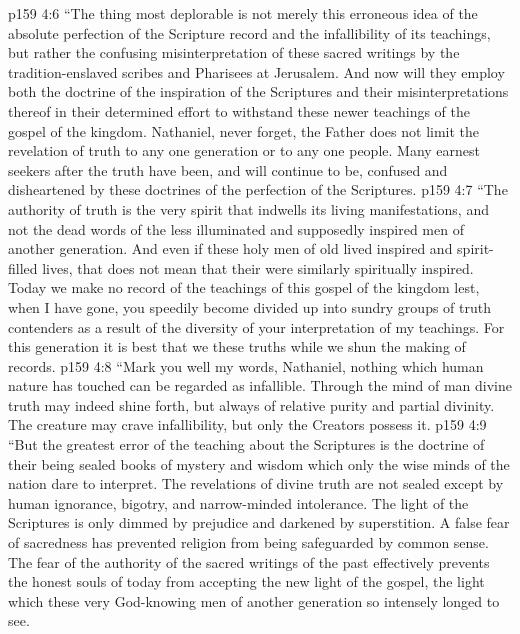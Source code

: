 \vs p159 4:6 \textcolor{ubdarkred}{“The thing most deplorable is not merely this erroneous idea of the absolute perfection of the Scripture record and the infallibility of its teachings, but rather the confusing misinterpretation of these sacred writings by the tradition\hyp{}enslaved scribes and Pharisees at Jerusalem. And now will they employ both the doctrine of the inspiration of the Scriptures and their misinterpretations thereof in their determined effort to withstand these newer teachings of the gospel of the kingdom. Nathaniel, never forget, the Father does not limit the revelation of truth to any one generation or to any one people. Many earnest seekers after the truth have been, and will continue to be, confused and disheartened by these doctrines of the perfection of the Scriptures.}
\vs p159 4:7 \textcolor{ubdarkred}{“The authority of truth is the very spirit that indwells its living manifestations, and not the dead words of the less illuminated and supposedly inspired men of another generation. And even if these holy men of old lived inspired and spirit\hyp{}filled lives, that does not mean that their  were similarly spiritually inspired. Today we make no record of the teachings of this gospel of the kingdom lest, when I have gone, you speedily become divided up into sundry groups of truth contenders as a result of the diversity of your interpretation of my teachings. For this generation it is best that we  these truths while we shun the making of records.}
\vs p159 4:8 \textcolor{ubdarkred}{“Mark you well my words, Nathaniel, nothing which human nature has touched can be regarded as infallible. Through the mind of man divine truth may indeed shine forth, but always of relative purity and partial divinity. The creature may crave infallibility, but only the Creators possess it.}
\vs p159 4:9 \textcolor{ubdarkred}{“But the greatest error of the teaching about the Scriptures is the doctrine of their being sealed books of mystery and wisdom which only the wise minds of the nation dare to interpret. The revelations of divine truth are not sealed except by human ignorance, bigotry, and narrow\hyp{}minded intolerance. The light of the Scriptures is only dimmed by prejudice and darkened by superstition. A false fear of sacredness has prevented religion from being safeguarded by common sense. The fear of the authority of the sacred writings of the past effectively prevents the honest souls of today from accepting the new light of the gospel, the light which these very God\hyp{}knowing men of another generation so intensely longed to see.}
